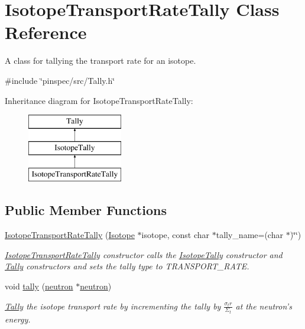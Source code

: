 \hypertarget{classIsotopeTransportRateTally}{\section{Isotope\-Transport\-Rate\-Tally Class Reference}
\label{classIsotopeTransportRateTally}
}


A class for tallying the transport rate for an isotope.  




{\ttfamily \#include \char`\"{}pinspec/src/\-Tally.\-h\char`\"{}}

Inheritance diagram for Isotope\-Transport\-Rate\-Tally\-:\begin{figure}[H]
\begin{center}
\leavevmode
\includegraphics[height=3.000000cm]{classIsotopeTransportRateTally}
\end{center}
\end{figure}
\subsection*{Public Member Functions}
\begin{DoxyCompactItemize}
\item 
\hyperlink{classIsotopeTransportRateTally_a80842d6877d46b24bc02f88e884c5e1d}{Isotope\-Transport\-Rate\-Tally} (\hyperlink{classIsotope}{Isotope} $\ast$isotope, const char $\ast$tally\-\_\-name=(char $\ast$)\char`\"{}\char`\"{})
\begin{DoxyCompactList}\small\item\em \hyperlink{classIsotopeTransportRateTally}{Isotope\-Transport\-Rate\-Tally} constructor calls the \hyperlink{classIsotopeTally}{Isotope\-Tally} constructor and \hyperlink{classTally}{Tally} constructors and sets the tally type to T\-R\-A\-N\-S\-P\-O\-R\-T\-\_\-\-R\-A\-T\-E. \end{DoxyCompactList}\item 
void \hyperlink{classIsotopeTransportRateTally_a5a747ab9d3704757ff9ec585fa402e84}{tally} (\hyperlink{structneutron}{neutron} $\ast$\hyperlink{structneutron}{neutron})
\begin{DoxyCompactList}\small\item\em \hyperlink{classTally}{Tally} the isotope transport rate by incrementing the tally by $ \frac{\sigma_tr}{\Sigma_t} $ at the neutron's energy. \end{DoxyCompactList}\end{DoxyCompactItemize}
